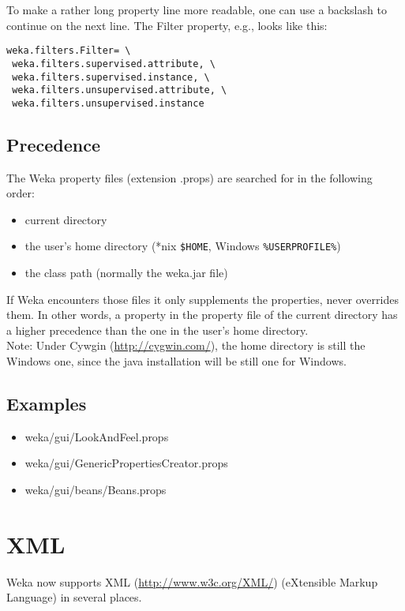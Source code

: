 \noindent To make a rather long property line more readable, one can
use a backslash to continue on the next line. The Filter property,
e.g., looks like this:

\begin{verbatim}
weka.filters.Filter= \
 weka.filters.supervised.attribute, \
 weka.filters.supervised.instance, \
 weka.filters.unsupervised.attribute, \
 weka.filters.unsupervised.instance
\end{verbatim}

\subsection{Precedence}
The Weka property files (extension .props) are searched for in the following order:

\begin{itemize}
\item current directory
\item the user's home directory (*nix \verb=$HOME=, Windows \verb=%USERPROFILE%=)
\item the class path (normally the weka.jar file) 
\end{itemize}

\noindent If Weka encounters those files it only supplements the
properties, never overrides them. In other words, a property in the
property file of the current directory has a higher precedence than
the one in the user's home directory.\\

\noindent Note: Under Cywgin (\url{http://cygwin.com/}{}), the home directory
is still the Windows one, since the java installation will be still
one for Windows.

\subsection{Examples}

\begin{itemize}
\item weka/gui/LookAndFeel.props
\item weka/gui/GenericPropertiesCreator.props
\item weka/gui/beans/Beans.props
\end{itemize}


\section{XML}
Weka now supports XML (\url{http://www.w3c.org/XML/}{}) (eXtensible
Markup Language) in several places.


